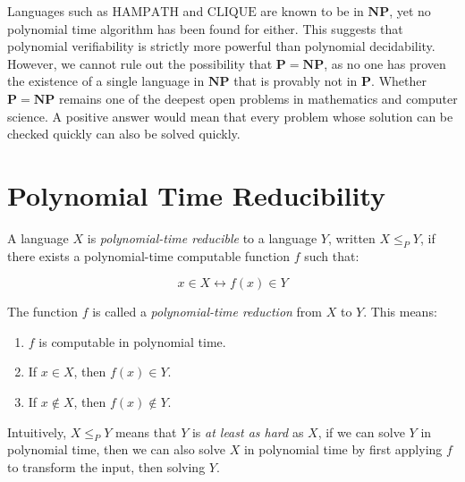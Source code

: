 \documentclass[12pt,a4paper,openany]{article}
\begin{document}
Languages such as $\text{HAMPATH}$ and $\text{CLIQUE}$ are known to be in $\mathbf{NP}$, yet no polynomial time algorithm has been found for either. 
This suggests that polynomial verifiability is strictly more powerful than polynomial decidability. However, we cannot rule out the possibility that $\mathbf{P} = \mathbf{NP}$, as no one has proven the existence of a single language in $\mathbf{NP}$ that is provably not in $\mathbf{P}$.
Whether $\mathbf{P} = \mathbf{NP}$ remains one of the deepest open problems in mathematics and computer science. A positive answer would mean that every problem whose solution can be checked quickly can also be solved quickly.

\begin{center}
\end{center}

\section{Polynomial Time Reducibility}

A language $X$ is \emph{polynomial-time reducible} to a language $Y$, written $X \leq_P Y$, if there exists a polynomial-time computable function $f$ such that:

\[
x \in X \leftrightarrow f(x) \in Y
\]

The function $f$ is called a \emph{polynomial-time reduction} from $X$ to $Y$. This means:

\begin{enumerate}
    \item $f$ is computable in polynomial time.
    \item If $x \in X$, then $f(x) \in Y$.
    \item If $x \notin X$, then $f(x) \notin Y$.
\end{enumerate}

Intuitively, $X \leq_P Y$ means that $Y$ is \emph{at least as hard} as $X$, if we can solve $Y$ in polynomial time, then we can also solve $X$ in polynomial time by first applying $f$ to transform the input, then solving $Y$.
\end{document}

